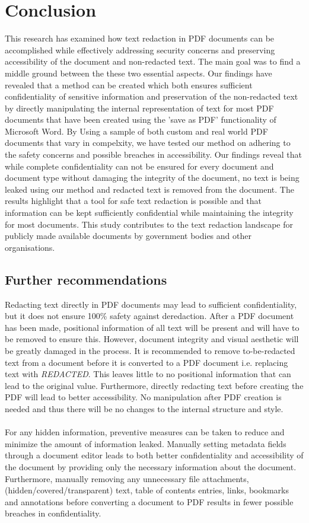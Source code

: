 \section{Conclusion}
This research has examined how text redaction in PDF documents can be accomplished while
effectively addressing security concerns and preserving accessibility of the document and non-redacted text. The main goal was to find a middle ground between the these two essential aspects. Our findings have revealed that a method can be created which both ensures sufficient confidentiality of sensitive information and preservation of the non-redacted text by directly manipulating the internal representation of text for most PDF documents that have been created using the 'save as PDF' functionality of Microsoft Word. By Using a
sample of both custom and real world PDF documents that vary in compelxity, we have tested our method on adhering to the safety concerns and possible breaches in accessibility. Our findings reveal that while complete confidentiality can not be ensured for every document and document type without damaging the integrity of the document,
no text is being leaked using our method and redacted text is removed from the document.
The results highlight that a tool for safe text redaction is possible and that information
can be kept sufficiently confidential while maintaining the integrity for most documents. This study contributes to the text redaction landscape for publicly made available documents by government bodies and other organisations.



\subsection{Further recommendations}
Redacting text directly in PDF documents may lead to sufficient confidentiality, but it does not ensure 100\% safety against deredaction. After a PDF document has been made, positional information of all text will be present and will have to be removed to ensure this. However, document integrity and visual aesthetic will be greatly damaged in the process. It is recommended to remove to-be-redacted text from a document before it is converted to a PDF document i.e. replacing text with \textit{REDACTED}. This leaves little to no positional information that can lead to the original value. Furthermore, directly redacting text before creating the PDF will lead to better accessibility. No manipulation after PDF creation is needed and thus there will be no changes to the internal structure and style. 
\\\\
For any hidden information, preventive measures can be taken to reduce and minimize the amount of information leaked. Manually setting metadata fields through a document editor leads to both better confidentiality and accessibility of the document by providing only the necessary information about the document. Furthermore, manually removing any unnecessary file attachments, (hidden/covered/transparent) text, table of contents entries, links, bookmarks and annotations before converting a document to PDF results in fewer possible breaches in confidentiality.

